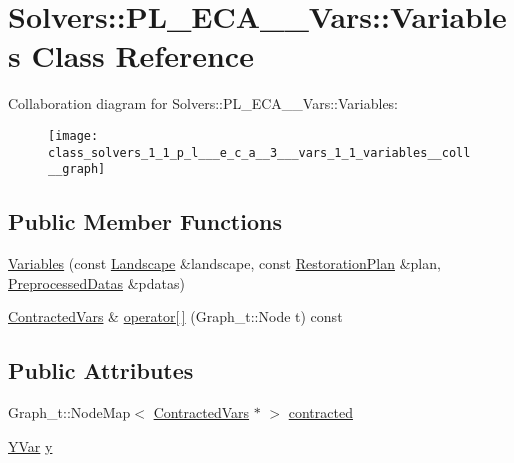 \hypertarget{class_solvers_1_1_p_l___e_c_a__3___vars_1_1_variables}{}\section{Solvers\+:\+:P\+L\+\_\+\+E\+C\+A\+\_\+\_\+\+Vars\+:\+:Variables Class Reference}
\label{class_solvers_1_1_p_l___e_c_a__3___vars_1_1_variables}


Collaboration diagram for Solvers\+:\+:P\+L\+\_\+\+E\+C\+A\+\_\+\_\+\+Vars\+:\+:Variables\+:\nopagebreak
\begin{figure}[H]
\begin{center}
\leavevmode
\texttt{[image: class\_solvers\_1\_1\_p\_l\_\_\_e\_c\_a\_\_3\_\_\_vars\_1\_1\_variables\_\_coll\_\_graph]}
\end{center}
\end{figure}
\subsection*{Public Member Functions}
\begin{DoxyCompactItemize}
\item 
\hyperlink{class_solvers_1_1_p_l___e_c_a__3___vars_1_1_variables_af5d2dda01613743db53373f7565cd301}{Variables} (const \hyperlink{class_landscape}{Landscape} \&landscape, const \hyperlink{class_restoration_plan}{Restoration\+Plan} \&plan, \hyperlink{class_preprocessed_datas}{Preprocessed\+Datas} \&pdatas)
\item 
\hyperlink{class_solvers_1_1_p_l___e_c_a__3___vars_1_1_contracted_vars}{Contracted\+Vars} \& \hyperlink{class_solvers_1_1_p_l___e_c_a__3___vars_1_1_variables_ab5cc49f0d58e28c8fa3bdbad8eb599d8}{operator\mbox{[}$\,$\mbox{]}} (Graph\+\_\+t\+::\+Node t) const
\end{DoxyCompactItemize}
\subsection*{Public Attributes}
\begin{DoxyCompactItemize}
\item 
Graph\+\_\+t\+::\+Node\+Map$<$ \hyperlink{class_solvers_1_1_p_l___e_c_a__3___vars_1_1_contracted_vars}{Contracted\+Vars} $\ast$ $>$ \hyperlink{class_solvers_1_1_p_l___e_c_a__3___vars_1_1_variables_a401005bfdd6e7ff2c72641e3961b6c4e}{contracted}
\item 
\hyperlink{class_solvers_1_1_p_l___e_c_a__3___vars_1_1_y_var}{Y\+Var} \hyperlink{class_solvers_1_1_p_l___e_c_a__3___vars_1_1_variables_ae6335ec508c6c2a9fa5d3cd0784ef697}{y}
\end{DoxyCompactItemize}


